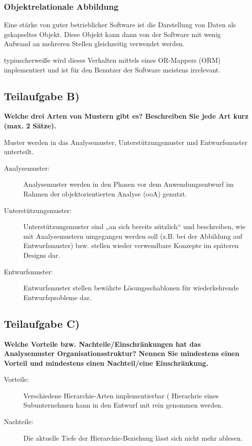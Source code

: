 \subsubsection{Objektrelationale Abbildung}
Eine stärke von guter betrieblicher Software ist die Darstellung von Daten als
gekapseltes Objekt. Diese Objekt kann dann von der Software mit wenig Aufwand an
mehreren Stellen gleichzeitig verwendet werden.

typiuscherweiße wird dieses Verhalten mittels eines OR-Mappers (ORM)
implementiert und ist für den Benutzer der Software meistens irrelevant.


\subsection{Teilaufgabe B)}
\textbf{Welche drei Arten von Mustern gibt es? Beschreiben Sie jede Art kurz
(max. 2 Sätze).}

Muster werden in das Analysemuster, Unterstützungsmuster und Entwurfsmuster
unterteilt.

\begin{description}
  \item[Analysemuster:]
  Analysemuster werden in den Phasen vor dem Anwendungsentwurf im Rahmen der
  objektorientierten Analyse (ooA) genutzt.
  
  \item[Unterstützungsmuster:] 
  Unterstützungsmuster sind „an sich bereits nützlich“ und beschreiben, wie mit
  Analysemustern umgegangen werden soll (z.B. bei der Abbildung auf
  Entwurfsmuster) bzw. stellen wieder verwendbare Konzepte im späteren
  Designs dar.
  
  \item[Entwurfsmuster:] 
  Entwurfsmuster stellen bewährte Lösungsschablonen für wiederkehrende
  Entwurfsprobleme dar.
\end{description}

\subsection{Teilaufgabe C)}
\textbf{Welche Vorteile bzw. Nachteile/Einschränkungen hat das Analysemuster
Organisationsstruktur? Nennen Sie mindestens einen Vorteil und mindestens einen
Nachteil/eine Einschränkung.}

\begin{description}
  \item[Vorteile:] Verschiedene Hierarchie-Arten implementierbar (\zB
  Hierachrie eines Subunternehmen kann in den Entwurf mit rein genommen werden.
  
  \item[Nachteile:] Die aktuelle Tiefe der Hierarchie-Beziehung lässt sich nicht
  mehr ablesen.
\end{description}

